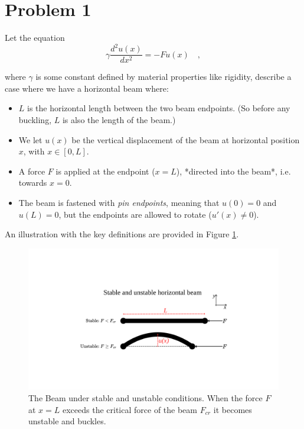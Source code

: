 \documentclass[final, 3p, times, 11.5pt]{article}
\begin{document}
\section{Problem 1}

Let the equation 
\begin{equation}\label{eq:1d_buckling_beam}
        \gamma \frac{d^2 u(x)}{dx^2} = - F u(x) \quad ,
\end{equation}

where $\gamma$ is some constant defined by material properties like rigidity, describe a case where we have a horizontal beam where:
    \begin{itemize}
        \item $L$ is the horizontal length between the two beam endpoints. (So before any buckling, $L$ is also the length of the beam.)
        \item We let $u(x)$ be the vertical displacement of the beam at horizontal position $x$, with $x \in [0,L]$.
        \item A force $F$ is applied at the endpoint ($x=L$), *directed into the beam*, i.e. towards $x=0$. 
        \item The beam is fastened with \textit{pin endpoints}, meaning that $u(0)=0$ and $u(L)=0$, but the endpoints are allowed to rotate ($u'(x) \neq 0$).
    \end{itemize}

An illustration with the key definitions are provided in Figure \ref{fig:beam_illustration}. 

\begin{figure}[h!]
    \centering
    \includegraphics[width=.9\textwidth]{Project 2/Figures/horizontal_beam.pdf}
    \caption{The Beam under stable and unstable conditions. When the force $F$ at $x=L$ exceeds the critical force of the beam $F_{cr}$ it becomes unstable and buckles.}
    \label{fig:beam_illustration}
\end{figure}
\end{document}
